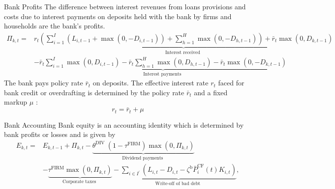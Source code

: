 \documentclass[9pt]{beamer}
\begin{document}
\begin{frame}{Bank Profits}
    The difference between interest revenues from loans provisions and costs due to interest payments on deposits held with the bank by firms and households are the bank's profits. 
\begin{equation}
    \begin{aligned}
\Pi_{k,t}= & \underbrace{r_t\left(\sum_{i=1}^I \left(L_{i,t-1}+\max \left(0,-D_{i,t-1}\right)\right)+\sum_{h=1}^H \max \left(0,-D_{h,t-1}\right)\right)+\bar{r}_t \max \left(0, D_{k,t-1}\right)}_{\text {Interest received }} \\
& -\underbrace{\bar{r}_t \sum_{i=1}^I \max \left(0, D_{i,t-1}\right)-\bar{r}_t \sum_{h=1}^H \max \left(0, D_{h,t-1}\right)-\bar{r}_t \max \left(0,-D_{k,t-1}\right)}_{\text {Interest payments }}
\end{aligned}
\end{equation}
The bank pays policy rate $\bar{r}_t$ on deposits.   The effective interest rate $r_t$ faced for bank credit or overdrafting is determined by the policy rate $\bar{r}_t$ and a fixed markup $\mu$ :
\begin{equation}
    r_t=\bar{r}_t+\mu
\end{equation}
\hyperlink{ReturnOverview}{}

\end{frame}
\begin{frame}{Bank Accounting}
Bank equity is an accounting identity which is determined by bank profits or losses and is given by
    \begin{equation}
    \begin{aligned}
E_{k,t}= & E_{k,t-1}+\Pi_{k,t}-\underbrace{\theta^{\text {DIV }}\left(1-\tau^{\mathrm{FIRM}}\right) \max \left(0, \Pi_{k,t}\right)}_{\text {Dividend payments }} \\
& -\underbrace{\tau^{\mathrm{FIRM}} \max \left(0, \Pi_{k,t}\right)}_{\text {Corporate taxes }}-\underbrace{\sum_{i \in I^{\prime}}\left(L_{i,t}-D_{i,t}-\zeta^{\mathrm{b}} \bar{P}_i^{\mathrm{CF}}(t) K_{i,t}\right)}_{\text {Write-off of bad debt }},
\end{aligned}
\end{equation}
      \hyperlink{ReturnOverview}{}

\end{frame}
\end{document}
